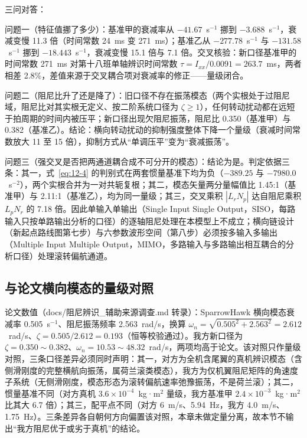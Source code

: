 \documentclass[11pt,a4paper]{ctexart}
\begin{document}
三问对答：

问题一（特征值挪了多少）：基准甲的衰减率从 $-41.67$~s$^{-1}$ 挪到 $-3.688$~s$^{-1}$，衰减变慢 11.3 倍（时间常数 24~ms 变 271~ms）；基准乙从 $-277.78$~s$^{-1}$ 与 $-131.58$~s$^{-1}$ 挪到 $-18.443$~s$^{-1}$，衰减变慢 15.1 倍与 7.1 倍。交叉核验：新口径基准甲的时间常数 271~ms 对第十八班单轴辨识时间常数 $\tau=I_{xx}/0.0091=263.7$~ms，两者相差 2.8\%，差值来源于交叉耦合项对衰减率的修正——量级闭合。

问题二（阻尼比升了还是降了）：旧口径不存在振荡模态（两个实根处于过阻尼域，阻尼比对其实根无定义、按二阶系统口径为 $\zeta\ge 1$），任何转动扰动都在远短于拍周期的时间内被压平；新口径出现欠阻尼振荡，阻尼比 0.350（基准甲）与 0.382（基准乙）。结论：横向转动扰动的抑制强度整体下降一个量级（衰减时间常数放大 11 至 15 倍），抑制方式从“单调压平”变为“衰减振荡”。

问题三（强交叉是否把两通道耦合成不可分开的模态）：结论为是。判定依据三条：其一，式~\eqref{eq:12-4} 的判别式在两套惯量基准下均为负（$-389.25$ 与 $-7980.0$~s$^{-2}$），两个实根合并为一对共轭复根；其二，模态矢量两分量幅值比 1.45:1（基准甲）与 2.11:1（基准乙），均为同一量级；其三，交叉乘积 $|L_r N_p|$ 达自阻尼乘积 $L_p N_r$ 的 7.18 倍。因此单输入单输出（Single Input Single Output，SISO，每路输入只按单路输出分析的口径）的逐轴阻尼处理在本模型上不成立；横向链设计（新起点路线图第七步）与六参数波形空间（第八步）必须按多输入多输出（Multiple Input Multiple Output，MIMO，多路输入与多路输出相互耦合的分析口径）处理滚转偏航通道。

\subsection{与论文横向模态的量级对照}

论文数值（docs/阻尼辨识\_辅助来源调查.md 转录）：SparrowHawk 横向模态衰减率 0.505~s$^{-1}$、阻尼振荡频率 2.563~rad/s，换算 $\omega_n=\sqrt{0.505^2+2.563^2}=2.612$~rad/s、$\zeta=0.505/2.612=0.193$（恒等校验通过）。我方新口径为 $\zeta=0.350\sim0.382$、$\omega_n=10.53\sim48.32$~rad/s，两项均高于论文。该对照只作量级对照，三条口径差异必须同时声明：其一，对方为全机含尾翼的真机辨识模态（含侧滑刚度的完整横航向振荡，属荷兰滚类模态），我方为仅机翼阻尼矩阵的角速度子系统（无侧滑刚度，模态形态为滚转偏航速率弛豫振荡，不是荷兰滚）；其二，惯量基准不同（对方真机 $3.6\times10^{-4}$~kg·m$^2$ 量级，我方基准甲 $2.4\times10^{-3}$~kg·m$^2$ 比其大 6.7 倍）；其三，配平点不同（对方 6~m/s、5.94~Hz，我方 4.0~m/s、1.75~Hz）。三条差异各自朝何方向偏置该对照，本章未做定量分离，故本节不输出“我方阻尼优于或劣于真机”的结论。
\end{document}
